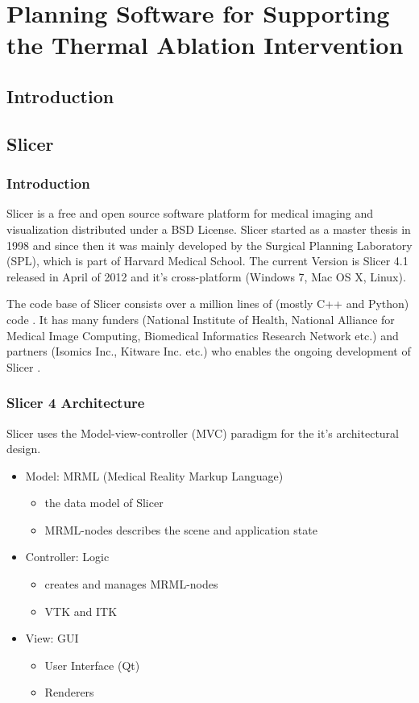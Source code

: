 \chapter{Planning Software for Supporting the Thermal Ablation Intervention}
\section{Introduction}

\section{Slicer}

\subsection{Introduction}

Slicer is a free and open source software platform for medical imaging and visualization distributed under a BSD License. Slicer started as a master thesis in 1998 and since then it was mainly developed by the Surgical Planning Laboratory (SPL), which is part of Harvard Medical School. The current Version is Slicer 4.1 released in April of 2012 and it's cross-platform (Windows 7, Mac OS X, Linux). 

The code base of Slicer consists over a million lines of (mostly C++ and Python) code \cite{slicer-intro}. It has many funders (National Institute of Health, National Alliance for Medical Image Computing, Biomedical Informatics Research Network etc.) and partners (Isomics Inc., Kitware Inc. etc.) who enables the ongoing development of Slicer \cite{slicer-intro}.

\subsection{Slicer 4 Architecture}

Slicer uses the Model-view-controller (MVC) paradigm for the it's architectural design. 

\begin{itemize}
\item Model: MRML (Medical Reality Markup Language)
\begin{itemize}
	\item the data model of Slicer 
	\item MRML-nodes describes the scene and application state
\end{itemize}
\item Controller: Logic 
\begin{itemize}
	\item creates and manages MRML-nodes
	\item VTK and ITK
\end{itemize}
\item View: GUI
\begin{itemize}
	\item User Interface (Qt)
	\item Renderers
\end{itemize}
\end{itemize}


